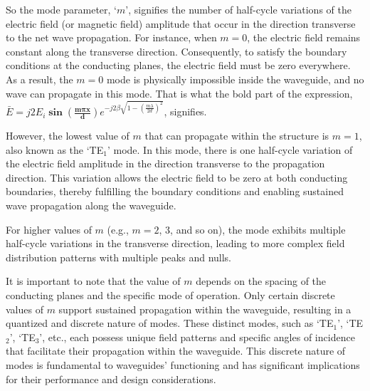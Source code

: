 So the mode parameter, `$m$', signifies the number of half-cycle variations of the electric field (or magnetic field) amplitude that occur in the direction transverse to the net wave propagation. For instance, when $m=0$, the electric field remains constant along the transverse direction. Consequently, to satisfy the boundary conditions at the conducting planes, the electric field must be zero everywhere. As a result, the $m=0$ mode is physically impossible inside the waveguide, and no wave can propagate in this mode. That is what the bold part of the expression, $\bar{E} = j 2E_i\boldsymbol{\sin(\frac{m\pi x}{d})}e^{-j 2\beta\sqrt{1 - \left(\frac{m\lambda}{2d}\right)^2}}$, signifies.

However, the lowest value of $m$ that can propagate within the structure is $m=1$, also known as the `TE$_1$' mode. In this mode, there is one half-cycle variation of the electric field amplitude in the direction transverse to the propagation direction. This variation allows the electric field to be zero at both conducting boundaries, thereby fulfilling the boundary conditions and enabling sustained wave propagation along the waveguide.

For higher values of $m$ (e.g., $m=2$, $3$, and so on), the mode exhibits multiple half-cycle variations in the transverse direction, leading to more complex field distribution patterns with multiple peaks and nulls.

It is important to note that the value of $m$ depends on the spacing of the conducting planes and the specific mode of operation. Only certain discrete values of $m$ support sustained propagation within the waveguide, resulting in a quantized and discrete nature of modes. These distinct modes, such as `TE$_1$', `TE$_2$', `TE$_3$', etc., each possess unique field patterns and specific angles of incidence that facilitate their propagation within the waveguide. This discrete nature of modes is fundamental to waveguides' functioning and has significant implications for their performance and design considerations.

